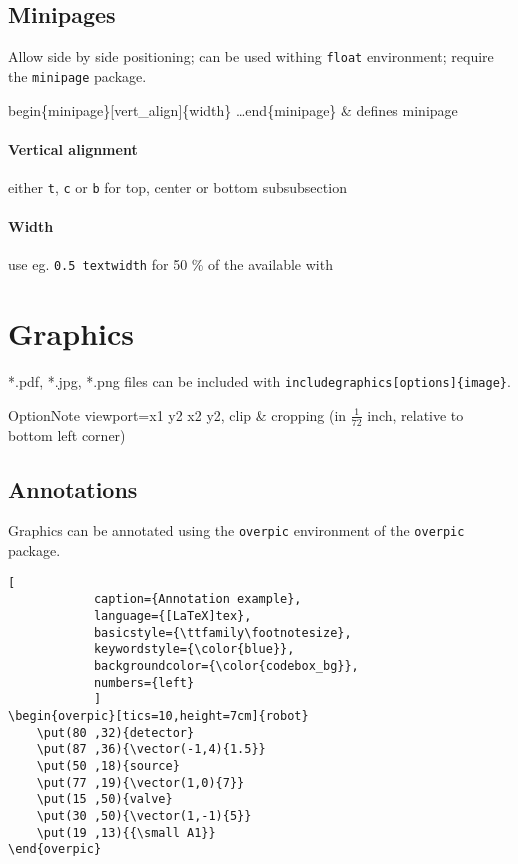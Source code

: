     \subsection{Minipages}
        Allow side by side positioning; can be used withing \texttt{float} environment; require the \texttt{minipage} package.
        
        \begin{cmdtab}
            \bs begin\{minipage\}[vert\_align]\{width\} \dots \bs end\{minipage\} & defines minipage \\
        \end{cmdtab}

        \paragraph{Vertical alignment}{
            either \texttt{t}, \texttt{c} or \texttt{b} for top, center or bottom
        }
        subsubsection
        \paragraph{Width}{
            use eg. \texttt{0.5 \bs textwidth} for 50 \% of the available with
        }

\section{Graphics}
    \label{section:graphics}
    *.pdf, *.jpg, *.png files can be included with \texttt{\bs includegraphics[options]\{image\}}.

    \begin{cmdtabx}{Option}{Note}
        viewport=x1 y2 x2 y2, clip & cropping (in $ \frac{1}{72} $ inch, relative to bottom left corner) \\
    \end{cmdtabx}
    
    \subsection{Annotations}
        Graphics can be annotated using the \texttt{overpic} environment of the \texttt{overpic} package.
        
        \begin{lstlisting}[
            caption={Annotation example},
            language={[LaTeX]tex},
            basicstyle={\ttfamily\footnotesize},
            keywordstyle={\color{blue}},
            backgroundcolor={\color{codebox_bg}},
            numbers={left}
            ]
\begin{overpic}[tics=10,height=7cm]{robot}
    \put(80 ,32){detector}
    \put(87 ,36){\vector(-1,4){1.5}}
    \put(50 ,18){source}
    \put(77 ,19){\vector(1,0){7}}
    \put(15 ,50){valve}
    \put(30 ,50){\vector(1,-1){5}}
    \put(19 ,13){{\small A1}}
\end{overpic}
        \end{lstlisting}

